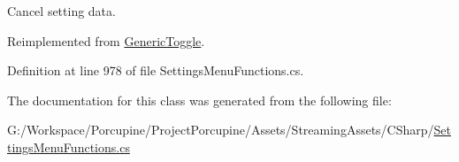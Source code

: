 Cancel setting data. 



Reimplemented from \hyperlink{class_generic_toggle_a11d9c35a3c20308376d1a126c3bfc874}{Generic\+Toggle}.



Definition at line 978 of file Settings\+Menu\+Functions.\+cs.



The documentation for this class was generated from the following file\+:\begin{DoxyCompactItemize}
\item 
G\+:/\+Workspace/\+Porcupine/\+Project\+Porcupine/\+Assets/\+Streaming\+Assets/\+C\+Sharp/\hyperlink{_settings_menu_functions_8cs}{Settings\+Menu\+Functions.\+cs}\end{DoxyCompactItemize}
